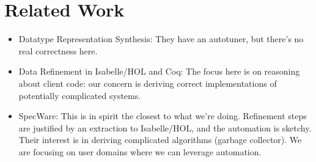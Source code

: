 \section{Related Work}

\begin{itemize}
\item Datatype Representation Synthesis\cite{Hawkins+2011}: They have an
  autotuner, but there's no real correctness here.
\item Data Refinement in Isabelle/HOL\cite{Lammich+2013, Haftman+2013}
  and Coq\cite{Cohen+2013}: The focus here is on reasoning about
  client code: our concern is deriving correct implementations of
  potentially complicated systems.
\item SpecWare\cite{SpecWare}: This is in spirit the closest to
  what we're doing. Refinement steps are justified by an extraction
  to Isabelle/HOL, and the automation is sketchy. Their interest is in
  deriving complicated algorithms (garbage collector). We are focusing
  on user domains where we can leverage automation.
\end{itemize}
